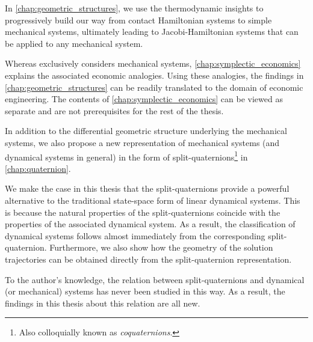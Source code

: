 In \cref{chap:geometric_structures}, we use the thermodynamic insights to progressively build our way from contact Hamiltonian systems to simple mechanical systems, ultimately leading to Jacobi-Hamiltonian systems that can be applied to any mechanical system.
%

Whereas  exclusively considers mechanical systems, \cref{chap:symplectic_economics} explains the associated economic analogies. Using these analogies, the findings in \cref{chap:geometric_structures} can be readily translated to the domain of economic engineering. 
The contents of \cref{chap:symplectic_economics} can be viewed as separate and are not prerequisites for the rest of the thesis.

In addition to the differential geometric structure underlying the mechanical systems, we also propose a new representation of mechanical systems (and dynamical systems in general) in the form of split-quaternions\footnote{Also colloquially known as \emph{coquaternions}.} in \cref{chap:quaternion}. 

We make the case in this thesis that the split-quaternions provide a powerful alternative to the traditional state-space form of linear dynamical systems. This is because the natural properties of the split-quaternions coincide with the properties of the associated dynamical system. As a result, the classification of dynamical systems follows almost immediately from the corresponding split-quaternion. Furthermore, we also show how the geometry of the solution trajectories can be obtained directly from the split-quaternion representation.

To the author's knowledge, the relation between split-quaternions and dynamical (or mechanical) systems has never been studied in this way. As a result, the findings in this thesis about this relation are all new.
